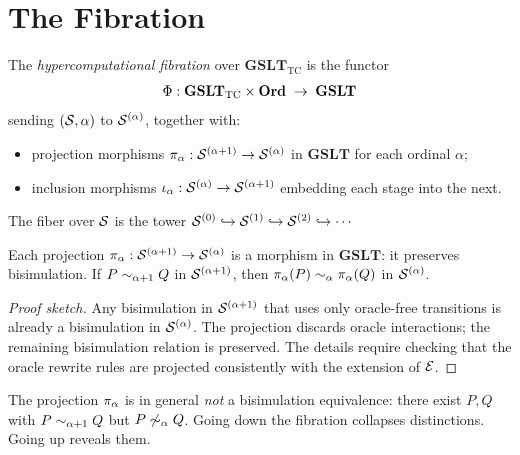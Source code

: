 \section{The Fibration}

\begin{definition}
The \emph{hypercomputational fibration} over $\mathbf{GSLT}_{\mathrm{TC}}$
is the functor
\[
  \Phi : \mathbf{GSLT}_{\mathrm{TC}} \times \mathbf{Ord} \;\to\; \mathbf{GSLT}
\]
sending $(\mathcal{S}, \alpha)$ to $\mathcal{S}^{(\alpha)}$, together with:
\begin{itemize}[itemsep=2pt]
  \item projection morphisms $\pi_{\alpha} : \mathcal{S}^{(\alpha+1)} \to \mathcal{S}^{(\alpha)}$
        in $\mathbf{GSLT}$ for each ordinal $\alpha$;
  \item inclusion morphisms $\iota_\alpha : \mathcal{S}^{(\alpha)} \to \mathcal{S}^{(\alpha+1)}$
        embedding each stage into the next.
\end{itemize}
The fiber over $\mathcal{S}$ is the tower
$\mathcal{S}^{(0)} \hookrightarrow \mathcal{S}^{(1)} \hookrightarrow \mathcal{S}^{(2)}
\hookrightarrow \cdots$
\end{definition}

\begin{proposition}
Each projection $\pi_{\alpha} : \mathcal{S}^{(\alpha+1)} \to \mathcal{S}^{(\alpha)}$
is a morphism in $\mathbf{GSLT}$: it preserves bisimulation.
If $P \sim_{\alpha+1} Q$ in $\mathcal{S}^{(\alpha+1)}$, then
$\pi_{\alpha}(P) \sim_\alpha \pi_{\alpha}(Q)$ in $\mathcal{S}^{(\alpha)}$.
\end{proposition}

\begin{proof}[Proof sketch]
Any bisimulation in $\mathcal{S}^{(\alpha+1)}$ that uses only oracle-free
transitions is already a bisimulation in $\mathcal{S}^{(\alpha)}$.
The projection discards oracle interactions; the remaining
bisimulation relation is preserved.
The details require checking that the oracle rewrite rules are
projected consistently with the extension of $\mathcal{E}$.
\end{proof}

\begin{remark}
The projection $\pi_{\alpha}$ is in general \emph{not} a
bisimulation equivalence: there exist $P, Q$ with
$P \sim_{\alpha+1} Q$ but $P \not\sim_\alpha Q$.
Going down the fibration collapses distinctions.
Going up reveals them.
\end{remark}

